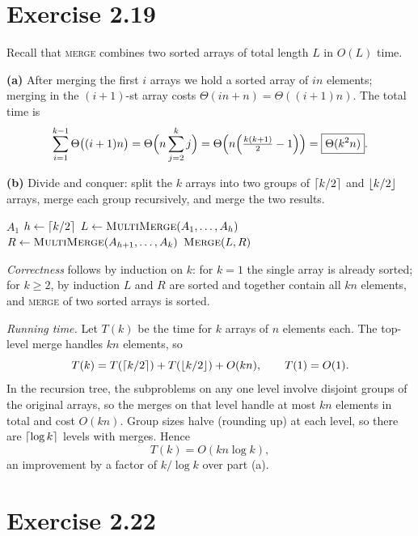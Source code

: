 \documentclass[11pt]{article}
\DeclarePairedDelimiter{\floor}{\lfloor}{\rfloor}
\DeclarePairedDelimiter{\ceil}{\lceil}{\rceil}
\theoremstyle{definition}
\begin{document}
\section*{Exercise 2.19}

Recall that \textsc{merge} combines two sorted arrays of total length $L$ in $O(L)$ time.

\textbf{(a)} After merging the first $i$ arrays we hold a sorted array of $in$ elements; merging in the
$(i+1)$-st array costs $\Theta(in+n)=\Theta((i+1)n)$. The total time is
\[
  \sum_{i=1}^{k-1}\Theta\bigl((i+1)n\bigr)
  =\Theta\Bigl(n\sum_{j=2}^{k}j\Bigr)
  =\Theta\Bigl(n\Bigl(\tfrac{k(k+1)}{2}-1\Bigr)\Bigr)
  =\boxed{\Theta(k^2n)}.
\]

\textbf{(b)} Divide and conquer: split the $k$ arrays into two groups of $\ceil{k/2}$ and $\floor{k/2}$ arrays,
merge each group recursively, and merge the two results.

\begin{algorithm}[H]
\caption{$k$-way merge}
\begin{algorithmic}[1]
   \State \Return $A_1$ \EndIf
  \State $h\gets\ceil{k/2}$
  \State $L\gets\Call{MultiMerge}{A_1,\dots,A_h}$
  \State $R\gets\Call{MultiMerge}{A_{h+1},\dots,A_k}$
  \State \Return $\Call{Merge}{L,R}$
\EndFunction
\end{algorithmic}
\end{algorithm}

\emph{Correctness} follows by induction on $k$: for $k=1$ the single array is already sorted; for $k\ge2$, by
induction $L$ and $R$ are sorted and together contain all $kn$ elements, and \textsc{merge} of two sorted arrays
is sorted.

\emph{Running time.} Let $T(k)$ be the time for $k$ arrays of $n$ elements each. The top-level merge handles
$kn$ elements, so
\[
  T(k)=T(\ceil{k/2})+T(\floor{k/2})+O(kn),\qquad T(1)=O(1).
\]
In the recursion tree, the subproblems on any one level involve disjoint groups of the original arrays, so the
merges on that level handle at most $kn$ elements in total and cost $O(kn)$. Group sizes halve (rounding up) at each
level, so there are $\ceil{\log k}$ levels with merges. Hence
\[
  T(k)=\boxed{O(kn\log k)},
\]
an improvement by a factor of $k/\log k$ over part (a).

\section*{Exercise 2.22}
\end{document}
